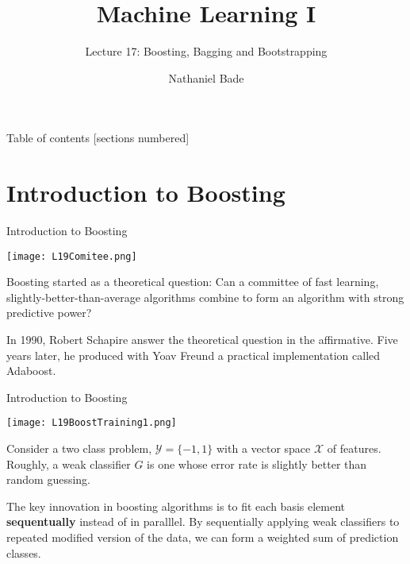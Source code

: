 \documentclass[10pt, table, dvipsnames,xcdraw, handout]{beamer}
\title{Machine Learning I}
\subtitle{Lecture 17: Boosting, Bagging and Bootstrapping}
\date{}
\author{Nathaniel Bade}
\institute{Northeastern University Department of Mathematics}
\newcommand{\cX}{\ensuremath{\mathcal{X}}}
\begin{document}
\maketitle

\begin{frame}{Table of contents}
  [sections numbered]
  \tableofcontents[hideallsubsections]
\end{frame}




%
% 
%
%
%
%
%

\section{Introduction to Boosting}

\begin{frame}[fragile]{Introduction to Boosting}
  \begin{minipage}[t][0.5\textheight][t]{\textwidth}
	\centering \texttt{[image: L19Comitee.png]} 
  \end{minipage}
  \vfill
\begin{minipage}[t][0.5\textheight][t]{\textwidth}
Boosting started as a theoretical question: Can a committee of fast learning, slightly-better-than-average algorithms combine to form an algorithm with strong predictive power? \pause\newline

 In 1990, Robert Schapire answer the theoretical question in the affirmative. Five years later, he produced with Yoav Freund a practical implementation called Adaboost.
\end{minipage}
\end{frame}




\begin{frame}[fragile]{Introduction to Boosting}
  \begin{minipage}[t][0.5\textheight][t]{\textwidth}
	\centering \texttt{[image: L19BoostTraining1.png]} 
  \end{minipage}
  \vfill
\begin{minipage}[t][0.5\textheight][t]{\textwidth}
Consider a two class problem, $\mathcal{Y} = \{-1,1\}$ with a vector space $\cX$ of features. Roughly, a weak classifier $G$ is one whose error rate is slightly better than random guessing. \pause\newline 

The key innovation in boosting algorithms is to fit each basis element \textbf{sequentually} instead of in paralllel. By sequentially applying weak classifiers to repeated modified version of the data, we can form a weighted sum of prediction classes. 
\end{minipage}
\end{frame}
\end{document}
